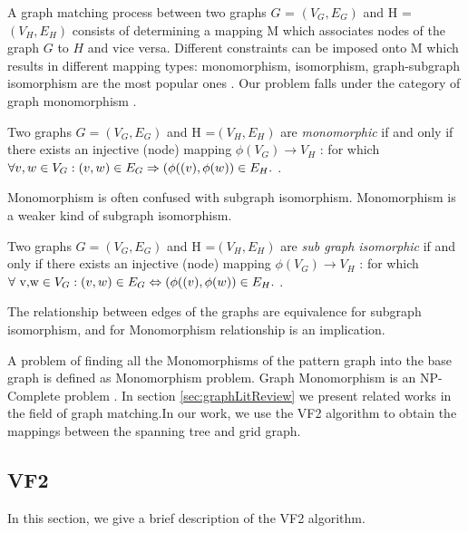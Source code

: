 A graph matching process between two graphs $G$ = $(V_G,E_G)$ and H = $(V_H,E_H)$ consists of determining a mapping M which associates nodes of the graph $G$ to $H$ and vice versa. Different constraints can be imposed onto M which results in different mapping types: monomorphism, isomorphism, graph-subgraph isomorphism are the most popular ones \cite{cordella1999performance}. Our problem falls under the category of graph monomorphism . 

Two graphs 
 $G =( V_G, E_G)$ and
 H =$( V_H, E_H)$  are \textit{monomorphic}  if and only if there exists an injective (node)
mapping $\phi (V_G) \rightarrow  V_H$ : for which $\forall v,w \in V_G:(v,w) \in E_G \Rightarrow (\phi((v),\space \phi(w)) \in E_H.$ \cite{singler2005graph}.

Monomorphism is often confused with subgraph isomorphism. Monomorphism is a weaker kind of subgraph isomorphism.

Two graphs  $G =( V_G, E_G)$ and
 H =$( V_H, E_H)$  are \textit{sub graph isomorphic}  if and only if there exists an injective (node)
mapping $\phi( V_G) \rightarrow  V_H$ : for which $\forall \text{ v,w} \in V_G:(v,w) \in E_G \Leftrightarrow (\phi((v),\space \phi(w)) \in E_H.$ \cite{singler2005graph}.

The relationship between edges of the graphs are equivalence for subgraph isomorphism, and for Monomorphism  relationship  is an implication.

A problem of finding all the Monomorphisms of the pattern graph into the base graph is defined as Monomorphism problem. Graph Monomorphism is an NP-Complete problem \cite{Garey:1979:CIG:578533}.  In section \ref{sec:graphLitReview} we present related works in the field of graph matching.In our work, we use the VF2 algorithm to obtain the mappings between the spanning tree and grid graph.

\subsection{VF2}

In this section, we give a brief description of the VF2 algorithm.


